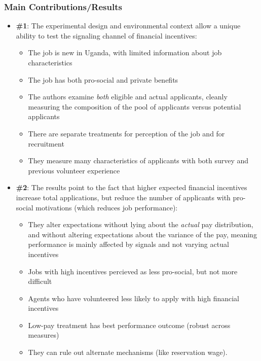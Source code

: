 \documentclass{beamer}
\begin{document}

\begin{frame}
\frametitle{Main Contributions/Results}
\begin{itemize}
\item \small{\textbf{\#1}: The experimental design and environmental context allow a unique ability to test the signaling channel of financial incentives:} 
\begin{itemize}
\item \footnotesize{The job is new in Uganda, with limited information about job characteristics}
\item \footnotesize{The job has both pro-social and private benefits}
\item \footnotesize{The authors examine \textit{both} eligible and actual applicants, cleanly measuring the composition of the pool of applicants versus potential applicants}
\item \footnotesize{There are separate treatments for perception of the job and for recruitment}
\item They measure many characteristics of applicants with both survey and previous volunteer experience
\end{itemize}
\medskip
\item \small{\textbf{\#2}: The results point to the fact that higher expected financial incentives increase total applications, but reduce the number of applicants with pro-social motivations (which reduces job performance):}
\begin{itemize}
\item \footnotesize{They alter expectations without lying about the \textit{actual} pay distribution, and without altering expectations about the variance of the pay, meaning performance is mainly affected by signals and not varying actual incentives}
\item \footnotesize{Jobs with high incentives percieved as less pro-social, but not more difficult}
\item \footnotesize{Agents who have volunteered less likely to apply with high financial incentives}
\item \footnotesize{Low-pay treatment has best performance outcome (robust across measures)}
\item \footnotesize{They can rule out alternate mechanisms (like reservation wage).}
\end{itemize}
\medskip


\end{itemize}
\medskip\medskip
\end{frame}
\end{document}
